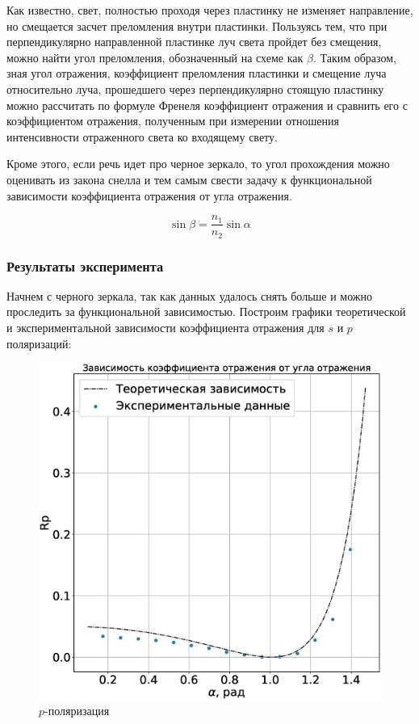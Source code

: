 \documentclass[a4paper,14pt]{extarticle}
\begin{document}
				Как известно, свет, полностью проходя через пластинку не изменяет направление, но смещается засчет преломления внутри пластинки. Пользуясь тем, что при перпендикулярно направленной пластинке луч света пройдет без смещения, можно найти угол преломления, обозначенный на схеме как $\beta$. Таким образом, зная угол отражения, коэффициент преломления пластинки и смещение луча относительно луча, прошедшего через перпендикулярно стоящую пластинку можно рассчитать по формуле Френеля коэффициент отражения и сравнить его с коэффициентом отражения, полученным при измерении отношения интенсивности отраженного света ко входящему свету.
				
				Кроме этого, если речь идет про черное зеркало, то угол прохождения можно оценивать из закона снелла и тем самым свести задачу к функциональной зависимости коэффициента отражения от угла отражения.
				
				\begin{equation}
					\sin{\beta} = \frac{n_1}{n_2} \sin{\alpha}
				\end{equation}
			\subsubsection{Результаты эксперимента}
				Начнем с черного зеркала, так как данных удалось снять больше и можно проследить за функциональной зависимостью. Построим графики теоретической и экспериментальной зависимости коэффициента отражения для $s$ и $p$ поляризаций:
				
				\newpage
				
				\begin{figure}[h!]
					\centering
					\includegraphics[width=1\linewidth]{Frenele_p.eps}
					\caption{$p$-поляризация}
					\label{fig3}
				\end{figure}
				
\end{document}
